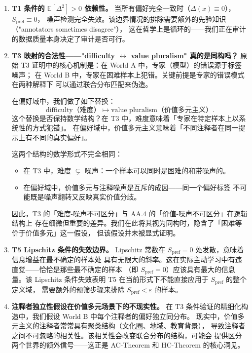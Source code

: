 \documentclass[12pt,a4paper]{article}
\newcommand{\E}{\mathbb{E}}
\begin{document}
\begin{enumerate}
    \item \textbf{T1 条件的 $\E[\Delta^2]>0$ 依赖性。}
    当所有偏好完全一致时（$\Delta(x)\equiv0$），$S_{\mathrm{pref}}\equiv0$，
    噪声检测完全失效。该边界情况的排除需要额外的先验知识（"annotators sometimes disagree"），
    这在哲学上是循环的——我们正在审计的数据质量本身决定了审计是否可行。
    \item \textbf{T3 映射的合法性——"difficulty $\leftrightarrow$ value pluralism" 真的是同构吗？}
    原始 T3 证明中的核心机制是：在 World A 中，专家（模型）的错误源于标签噪声；
    在 World B 中，专家在困难样本上犯错。关键前提是专家的错误模式在两种解释下
    可以通过联合分布匹配来伪造。

    在偏好域中，我们做了如下替换：
    \[
    \text{difficulty（难度）} \longmapsto \text{value pluralism（价值多元主义）}.
    \]
    这个替换是否保持数学结构？在 T3 中，难度意味着「专家在特定样本上以系统性的方式犯错」。
    在偏好域中，价值多元主义意味着「不同注释者在同一提示上有不同的真实偏好」。

    这两个结构的数学形式不完全相同：
    \begin{itemize}
        \item 在 T3 中，难度 $\subsetneq$ 噪声：一个样本可以同时是困难的和带噪声的。
        \item 在偏好域中，价值多元与注释噪声是互斥的成因——同一个偏好标签
              不可能既是噪声翻转又反映真实价值分歧。
    \end{itemize}
    因此，T3 的「难度-噪声不可区分」与 AA.4 的「价值-噪声不可区分」在逻辑结构上
    存在细微但重要的差异。我们在此将其视为同构时，隐含了「困难等价于价值多元」这一假设，
    但该假设并未被显式证明。
    \item \textbf{T5 Lipschitz 条件的失效边界。}
    Lipschitz 常数在 $S_{\mathrm{pref}} = 0$ 处发散，意味着信息增益在最不确定的样本处
    具有无限大的斜率。这在实际主动学习中有违直觉——恰恰是那些最不确定的样本
    （即 $S_{\mathrm{pref}}=0$）应该具有最大的信息量。该 Lipschitz 条件失效表明
    T5 在当前形式下不能直接应用于 $S_{\mathrm{pref}}$ 的整个定义域，
    需要额外的预筛步骤来排除 $S_{\mathrm{pref}} < \varepsilon$ 的样本。
    \item \textbf{注释者独立性假设在价值多元场景下的不现实性。}
    在 T3 条件验证的精细化构造中，我们假设 World B 中每个注释者的偏好独立同分布。
    现实中，价值多元主义的注释者常常具有聚类结构（文化圈、地域、教育背景），
    导致注释者之间不可忽略的相关性。该相关性会改变联合分布的结构，可能会
    提供区分两个世界的额外信号——这正是 AC-Theorem 和 HC-Theorem 的核心洞见。
\end{enumerate}
\end{document}
